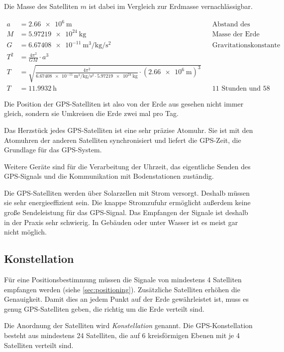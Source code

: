 \documentclass[12pt,a4paper]{scrartcl}
\begin{document}
Die Masse des Satelliten $m$ ist dabei im Vergleich zur Erdmasse vernachlässigbar.

\begin{align*}
a &= \SI{2.66e6}{\meter} && \text{Abstand des Satelliten}\\
M &= \SI{5.97219e24}{\kilo\gram} && \text{Masse der Erde}\\
G &= \SI{6.67408e-11}{\cubic\meter\per\kilo\gram\per\square\second} && \text{Gravitationskonstante} \\
T^2 &= \frac{4 \pi^2}{G M} \cdot a^3 \\
T &= \sqrt{\frac{4 \pi^2}{\SI{6.67408e-11}{\cubic\meter\per\kilo\gram\per\square\second} \cdot \SI{5.97219e24}{\kilo\gram}} \cdot (\SI{2.66e6}{\meter})^3} \\
T &= \SI{11.9932}{\hour} && \text{11 Stunden und 58 Minuten}
\end{align*}

Die Position der GPS-Satelliten ist also von der Erde aus gesehen nicht immer gleich, sondern sie Umkreisen die Erde zwei mal pro Tag.

Das Herzstück jedes GPS-Satelliten ist eine sehr präzise Atomuhr. Sie ist mit den Atomuhren der anderen Satelliten synchronisiert und liefert die GPS-Zeit, die Grundlage für das GPS-System.

Weitere Geräte sind für die Verarbeitung der Uhrzeit, das eigentliche Senden des GPS-Signals und die Kommunikation mit Bodenstationen zuständig.

Die GPS-Satelliten werden über Solarzellen mit Strom versorgt. Deshalb müssen sie sehr energieeffizient sein. Die knappe Stromzufuhr ermöglicht außerdem keine große Sendeleistung für das GPS-Signal. Das Empfangen der Signale ist deshalb in der Praxis sehr schwierig. In Gebäuden oder unter Wasser ist es meist gar nicht möglich.

\subsection{Konstellation}
Für eine Positionsbestimmung müssen die Signale von mindestens 4 Satelliten empfangen werden (siehe \ref{sec:positioning}). Zusätzliche Satelliten erhöhen die Genauigkeit. Damit dies an jedem Punkt auf der Erde gewährleistet ist, muss es genug GPS-Satelliten geben, die richtig um die Erde verteilt sind.

Die Anordnung der Satelliten wird \emph{Konstellation} genannt. Die GPS-Konstellation besteht aus mindestens 24 Satelliten, die auf 6 kreisförmigen Ebenen mit je 4 Satelliten verteilt sind.
\end{document}

